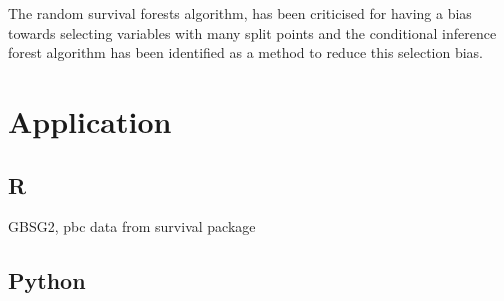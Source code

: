 \documentclass[
]{article}
\begin{document}
The random survival forests algorithm, has been criticised for having a
bias towards selecting variables with many split points and the
conditional inference forest algorithm has been identified as a method
to reduce this selection bias.

\hypertarget{application}{%
\section{Application}\label{application}}

\hypertarget{r}{%
\subsection{R}\label{r}}

GBSG2, pbc data from survival package

\hypertarget{python}{%
\subsection{Python}\label{python}}
\end{document}
